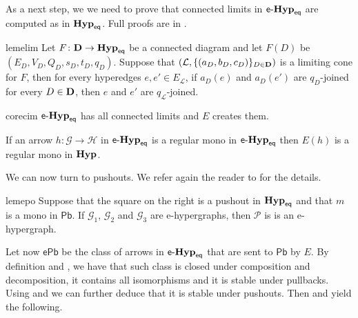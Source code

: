 \documentclass[3p]{elsarticle}
\newcommand{\pbc}{\mathsf{Pb}}
\newcommand{\pbe}{\mathsf{ePb}}
\newcommand{\eq}{\mathsf{eq}}
\def\D{\textbf {\textup{D}}}
\newcommand{\catname}[1]{\textbf{\textup{#1}}}
\newcommand{\hyp}{\catname{Hyp}}
\newcommand{\EqHyp}{\catname{Hyp}_{\mathsf{eq}}} %
\newcommand{\egg}{\mathsf{e}\text{-}\catname{Hyp}_\eq}
\theoremstyle{remark}
\theoremstyle{definition}
\begin{document}
As a next step, we we need to prove that connected limits in $\egg$ are computed as in $\EqHyp$. Full proofs are in .

\begin{restatable}{lem}{elim}\label{lem:elimc}
Let $F\colon \D\to \hyp_{\eq}$ be a connected diagram and let $F(D)$ be $(E_D, V_D, Q_D, s_D, t_D, q_D)$. Suppose that $(\mathcal{L}, \{(a_D, b_D, c_D)\}_{D\in \D})$ is a limiting cone for $F$, then for every hyperedges $e,e'\in E_{\mathcal{L}}$, if $a_D(e)$ and $a_D(e')$ are $q_D$-joined for every $D\in \D$, then $e$ and $e'$ are $q_{\mathcal{L}}$-joined.
\end{restatable}

\begin{restatable}{cor}{ecim}\label{lem:elim}
	$\egg$ has all connected limits and $E$ creates them.
\end{restatable}

\begin{cor}\label{cor:ereg}
	If an arrow $h: \mathcal{G \to H}$ in $\egg$ is a regular mono in $\egg$ then $E(h)$ is a regular mono in $\hyp$. 
\end{cor}

We can now turn to pushouts. We refer again the reader to  for the details.

\noindent
\begin{minipage}[l]{.83\linewidth}
	\begin{restatable}{lem}{epo}\label{lem:epo}
		Suppose that the square on the right is a pushout in $\EqHyp$ and that $m$ is a mono in $\pbc$. If $\mathcal{G}_1$, $\mathcal{G}_2$ and $\mathcal{G}_3$ are e-hypergraphs, then $\mathcal{P}$ is 
		is an e-hypergraph.
	\end{restatable}
\end{minipage}\hfill 
\begin{minipage}[r]{.15\linewidth}
\end{minipage}

Let now $\pbe$ be the class of arrows in $\egg$ that are sent to $\pbc$ by $E$. By definition and , we have that such class is closed under composition and decomposition, it contains all isomorphisms and it is stable under pullbacks. Using  and  we can further deduce that it is stable under pushouts. Then  and  yield the following.
\end{document}
